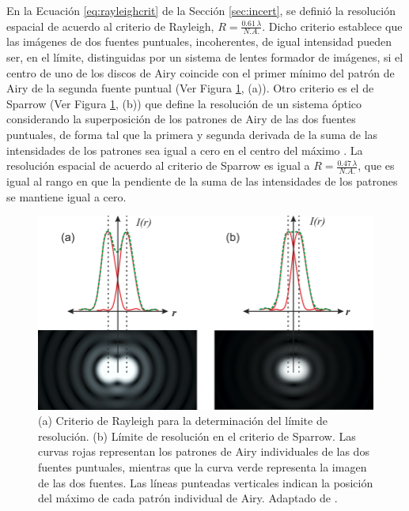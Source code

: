 En la Ecuación \ref{eq:rayleighcrit} de la Sección \ref{sec:incert}, se definió la resolución espacial de acuerdo al criterio de Rayleigh, $R = \frac{0.61 \hspace{2pt} \lambda}{ N.A.}$. Dicho criterio establece que las imágenes de dos fuentes puntuales, incoherentes, de igual intensidad pueden ser, en el límite, distinguidas por un sistema de lentes formador de imágenes, si el centro de uno de los discos de Airy coincide con el primer mínimo del patrón de Airy de la segunda fuente puntual (Ver Figura \ref{fig:critrayspa}, (a)). Otro criterio es el de Sparrow \cite{sparrow} (Ver Figura \ref{fig:critrayspa}, (b)) que define la resolución de un sistema óptico considerando la superposición de los patrones de Airy de las dos fuentes puntuales, de forma tal que la primera y segunda derivada de la suma de las intensidades de los patrones sea igual a cero en el centro del máximo \cite{raylsp}. La resolución espacial de acuerdo al criterio de Sparrow es igual a  $R = \frac{0.47 \hspace{2pt} \lambda}{ N.A.}$, que es igual al rango en que la pendiente de la suma de las intensidades de los patrones se mantiene igual a cero.

\begin{figure}[H]
	\centering
	\includegraphics[width=1.0\textwidth]{Figs/microespectrometro/raylspa.png}
	\caption{(a) Criterio de Rayleigh para la determinación del límite de resolución. (b) Límite de resolución en el criterio de Sparrow. Las curvas rojas representan los patrones de Airy individuales de las dos fuentes puntuales, mientras que la curva verde representa la imagen de las dos fuentes. Las líneas punteadas verticales indican la posición del máximo de cada patrón individual de Airy. Adaptado de \cite{raylsp}.}
	\label{fig:critrayspa}
\end{figure}

